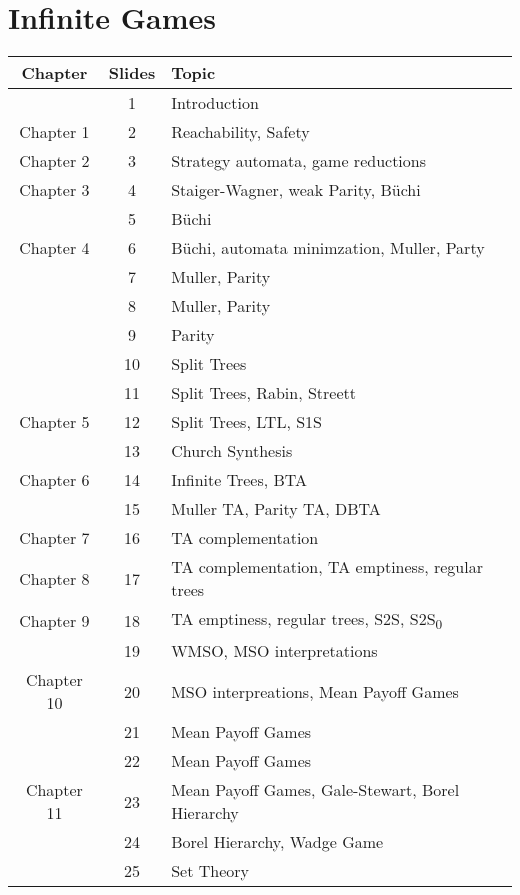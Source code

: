 \documentclass{article}
\begin{document}
\section*{Infinite Games}
\begin{tabular}{c|c|l}
	\textbf{Chapter} & \textbf{Slides} & \textbf{Topic} \\ \hline
	& 1 & Introduction
	\\ \hline
	Chapter 1 & 2 & Reachability, Safety
	\\ \hline
	Chapter 2 & 3 & Strategy automata, game reductions
	\\ \hline
	Chapter 3 & 4 & Staiger-Wagner, weak Parity, Büchi
	\\ \hline
	& 5 & Büchi
	\\ \hline
	Chapter 4 & 6 & Büchi, automata minimzation, Muller, Party
	\\ \hline
	& 7 & Muller, Parity
	\\ \hline
	& 8 & Muller, Parity
	\\ \hline
	& 9 & Parity
	\\ \hline
	& 10 & Split Trees
	\\ \hline
	& 11 & Split Trees, Rabin, Streett
	\\ \hline
	Chapter 5 & 12 & Split Trees, LTL, S1S
	\\ \hline
	& 13 & Church Synthesis
	\\ \hline
	Chapter 6 & 14 & Infinite Trees, BTA
	\\ \hline
	& 15 & Muller TA, Parity TA, DBTA
	\\ \hline
	Chapter 7 & 16 & TA complementation
	\\ \hline
	Chapter 8 & 17 & TA complementation, TA emptiness, regular trees
	\\ \hline
	Chapter 9 & 18 & TA emptiness, regular trees, S2S, S2S\textsubscript{0}
	\\ \hline
	& 19 & WMSO, MSO interpretations
	\\ \hline
	Chapter 10 & 20 & MSO interpreations, Mean Payoff Games
	\\ \hline
	& 21 & Mean Payoff Games
	\\ \hline
	& 22 & Mean Payoff Games
	\\ \hline
	Chapter 11 & 23 &  Mean Payoff Games, Gale-Stewart, Borel Hierarchy
	\\ \hline
	& 24 & Borel Hierarchy, Wadge Game
	\\ \hline
	& 25 & Set Theory
\end{tabular}
\newpage
\end{document}
